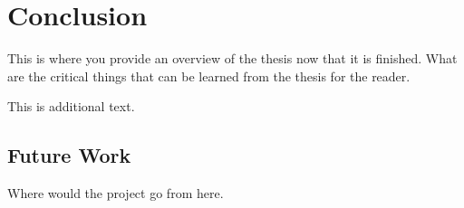 \chapter{Conclusion}
\label{chap:conclusion}

This is where you provide an overview of the thesis now that it is finished.  What are the critical things that can be learned from the thesis for the reader.

This is additional text.
\section{Future Work}
\label{sec:future}
Where would the project go from here.


